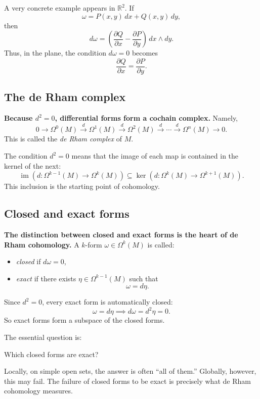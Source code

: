 \documentclass[12pt,a4paper]{article}
\theoremstyle{notespace}
\begin{document}
A very concrete example appears in \(\mathbb{R}^2\). If
\[
\omega=P(x,y)\,dx+Q(x,y)\,dy,
\]
then
\[
d\omega=\left(\frac{\partial Q}{\partial x}-\frac{\partial P}{\partial y}\right)\,dx\wedge dy.
\]
Thus, in the plane, the condition \(d\omega=0\) becomes
\[
\frac{\partial Q}{\partial x}=\frac{\partial P}{\partial y}.
\]

\subsection{The de Rham complex}

\textbf{Because \(d^2=0\), differential forms form a cochain complex.} Namely,
\[
0 \longrightarrow \Omega^0(M)\xrightarrow{d}\Omega^1(M)\xrightarrow{d}\Omega^2(M)\xrightarrow{d}\cdots\xrightarrow{d}\Omega^n(M)\longrightarrow 0.
\]
This is called the \emph{de Rham complex} of \(M\).

The condition \(d^2=0\) means that the image of each map is contained in the kernel of the next:
\[
\operatorname{im}(d:\Omega^{k-1}(M)\to \Omega^k(M))
\subseteq
\ker(d:\Omega^k(M)\to \Omega^{k+1}(M)).
\]
This inclusion is the starting point of cohomology.

\subsection{Closed and exact forms}

\textbf{The distinction between closed and exact forms is the heart of de Rham cohomology.} A \(k\)-form \(\omega\in \Omega^k(M)\) is called:

\begin{itemize}
	\item \emph{closed} if \(d\omega=0\),
	\item \emph{exact} if there exists \(\eta\in \Omega^{k-1}(M)\) such that
	\[
	\omega=d\eta.
	\]
\end{itemize}

Since \(d^2=0\), every exact form is automatically closed:
\[
\omega=d\eta \implies d\omega=d^2\eta=0.
\]
So exact forms form a subspace of the closed forms.

The essential question is:

\begin{center}
	Which closed forms are exact?
\end{center}

Locally, on simple open sets, the answer is often ``all of them.'' Globally, however, this may fail. The failure of closed forms to be exact is precisely what de Rham cohomology measures.
\end{document}
